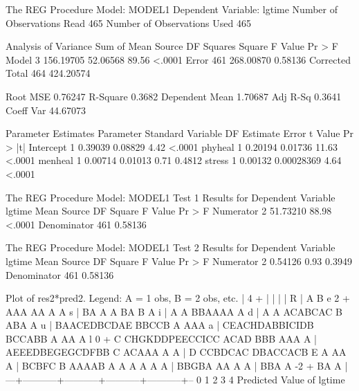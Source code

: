 \documentclass{article}
\begin{document}
\begin{Woutput}
The REG Procedure
Model: MODEL1
Dependent Variable: lgtime
Number of Observations Read         465
Number of Observations Used         465

                        Analysis of Variance
                                Sum of         Mean
Source                 DF      Squares       Square  F Value  Pr > F
Model                   3    156.19705     52.06568    89.56  <.0001
Error                 461    268.00870      0.58136
Corrected Total       464    424.20574

Root MSE              0.76247    R-Square     0.3682
Dependent Mean        1.70687    Adj R-Sq     0.3641
Coeff Var            44.67073

                        Parameter Estimates
                     Parameter       Standard
Variable     DF       Estimate          Error    t Value    Pr > |t|
Intercept     1        0.39039        0.08829       4.42      <.0001
phyheal       1        0.20194        0.01736      11.63      <.0001
menheal       1        0.00714        0.01013       0.71      0.4812
stress        1        0.00132     0.00028369       4.64      <.0001

The REG Procedure
Model: MODEL1
      Test 1 Results for Dependent Variable lgtime
                                Mean
Source             DF         Square    F Value    Pr > F
Numerator           2       51.73210      88.98    <.0001
Denominator       461        0.58136

The REG Procedure
Model: MODEL1
      Test 2 Results for Dependent Variable lgtime
                                Mean
Source             DF         Square    F Value    Pr > F
Numerator           2        0.54126       0.93    0.3949
Denominator       461        0.58136

       Plot of res2*pred2.  Legend: A = 1 obs, B = 2 obs, etc.
          |
        4 +
          |
          |
          |
          |
     R    |             A          B
     e  2 +                    AAA AA  A  A
     s    |                BA A A   BA    B A
     i    |             A  A BBAAAA         A
     d    |            A    A ACABCAC B ABA      A
     u    |              BAACEDBCDAE BBCCB  A AAA
     a    |            CEACHDABBICIDB BCCABB A  AA A
     l  0 +            C CHGKDDPEECCICC ACAD BBB AAA A
          |            AEEEDBEGEGCDFBB C ACAAA A A
          |            D   CCBDCAC DBACCACB  E   A    AA A
          |            BCBFC    B  AAAAB       A A   A  A  A A
          |                BBGBA      AA  A      A
          |                     BBA          A
       -2 +                         BA      A
          |
          ---+-----------+-----------+-----------+-----------+--
             0           1           2           3           4
                         Predicted Value of lgtime
\end{Woutput}
\end{document}
